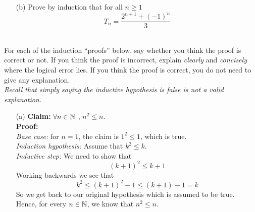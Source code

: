 \documentclass[11pt]{article}
\newif\ifsolutions
\renewcommand{\answer}[1]{{\color{mydarkblue}\textbf{Solutions: }#1}}
\begin{document}
\begin{qunlist}
\begin{itemize}
\newpage

\item[(b)] Prove by induction that for all $n \geq 1$
\[ T_n = \frac{2^{n+1}+(-1)^n}{3} \]

\ifsolutions
\answer{
(Strong Induction) $P(n)$ asserts that $T_n = \frac{2^{n+1}+(-1)^n}{3}$. 
We prove the statement by (strong) induction on $n$, showing that $P(n-2) \wedge P(n-1) \implies P(n)$.

\underline{Base cases:} $T_1 = 1$ as there is exactly one way to tile a $2 \times 1$ board, 
using tile \textbf{B}.
The $2 \times 2$ board can be tiled in exactly three different ways 
using the tiles \textbf{AA, BB} and \textbf{C},
so $T_2 = 3$. The base cases are true as 
\[P(1)=T_1=1=\frac{2^2+(-1)}{3} \quad\quad\quad P(2)=T_2=3=\frac{2^3+1}{3}\]

\underline{Induction Hypothesis:} Assume $P(n-1)$ and $P(n-2)$ are true for all $n > 2$.

\underline{Inductive step:} Using the recurrence relation derived in part (a), we have,
\begin{align*} 
T_n &= T_{n-1} + 2T_{n-2} \\
&= \frac{2^n + (-1)^{n-1}}{3}+2\cdot\frac{2^{n-1}+(-1)^{n-2}}{3}  &\text{[by induction hypothesis]} \\
&= \frac{2\cdot 2^n+(-1)^{n-2}(-1+2)}{3} \\
&= \frac{2^{n+1}+(-1)^n}{3}  &\text{[as } (-1)^{n-2} = (-1)^n \text{]} \\
\end{align*}
The claim is therefore true by (strong) induction for all natural numbers $n \geq 1$.
}
\fi


\end{itemize}



\pagebreak

 \\
For each of the induction ``proofs'' below, say whether you think the proof is correct or not.
If you think the proof is incorrect, 
explain \textit{clearly} and \textit{concisely} where the logical error lies.
If you think the proof is correct, you do not need to give any explanation. \\
\textit{Recall that simply saying the inductive hypothesis is false is not a valid explanation.}

\begin{itemize}
\item[(a)] \textbf{Claim:} $\forall n \in \mathbb{N}$ , $n^2 \leq n$. \\
\textbf{Proof:} \\
\textit{Base case:} for $n = 1$, the claim is $1^2 \leq 1$, which is true. \\
\textit{Induction hypothesis:} Assume that $k^2 \leq k$. \\
\textit{Inductive step:} We need to show that 
\[ (k+1)^2 \leq k+1\]
Working backwards we see that 
\[ k^2 \leq (k+1)^2 - 1 \leq (k+1) - 1 = k \]
So we get back to our original hypothesis which is assumed to be true.\\
Hence, for every $n \in \mathbb{N}$, we know that $n^2 \leq n$. 


\end{itemize}
\end{qunlist}
\end{document}
